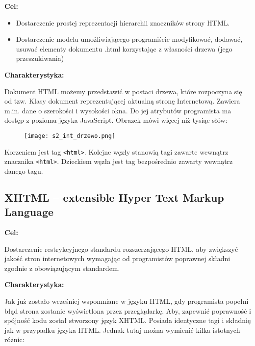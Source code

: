 \textbf{Cel:}
\begin{itemize}
\item Dostarczenie prostej reprezentacji hierarchii znaczników strony HTML.
\item Dostarczenie modelu umożliwiającego programiście modyfikować, dodawać, usuwać elementy dokumentu .html korzystając z własności drzewa (jego przeszukiwania)
\end{itemize}

\textbf{Charakterystyka:}

Dokument HTML możemy przedstawić w postaci drzewa, które rozpoczyna się od tzw. Klasy dokument reprezentującej aktualną stronę Internetową. Zawiera m.in. dane o szerokości i wysokości okna. Do jej atrybutów programista ma dostęp z poziomu języka JavaScript. Obrazek mówi więcej niż tysiąc słów:

\begin{figure}[H]
\centering
\texttt{[image: s2\_int\_drzewo.png]}
\end{figure}

Korzeniem jest tag \texttt{<html>}. Kolejne węzły stanowią tagi zawarte wewnątrz znacznika \texttt{<html>}. Dzieckiem węzła jest tag bezpośrednio zawarty wewnątrz danego tagu. 

\subsection{XHTML -- extensible Hyper Text Markup Language}

\textbf{Cel:}

Dostarczenie restrykcyjnego standardu rozszerzającego HTML, aby zwiększyć jakość stron internetowych wymagając od programistów poprawnej składni zgodnie z obowiązującym standardem.

\textbf{Charakterystyka:}

Jak już zostało wcześniej wspomniane w języku HTML, gdy programista popełni błąd strona zostanie wyświetlona przez przeglądarkę. Aby, zapewnić poprawność i spójność kodu został stworzony język XHTML. Posiada identyczne tagi i składnię jak w przypadku języka HTML. Jednak tutaj można wymienić kilka istotnych różnic:

